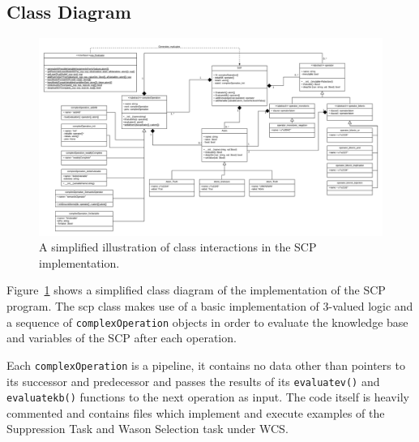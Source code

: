 \documentclass{article}
\begin{document}
\subsection{Class Diagram}

\begin{figure}
    \centering \includegraphics[width=\textwidth]{scpClassDiagram}
    \caption{A simplified illustration of class interactions in the SCP implementation.}
    \label{fig:classDiagram}
\end{figure}

Figure~\ref{fig:classDiagram} shows a simplified class diagram of the implementation of the SCP program. The scp class makes use of a basic implementation of 3-valued logic and a sequence of \texttt{complexOperation} objects in order to evaluate the knowledge base and variables of the SCP after each operation.

Each \texttt{complexOperation} is a pipeline, it contains no data other than pointers to its successor and predecessor and passes the results of its \texttt{evaluatev()} and \texttt{evaluatekb()} functions to the next operation as input. The code itself is heavily commented and contains files which implement and execute examples of the Suppression Task and Wason Selection task under WCS.
\end{document}
